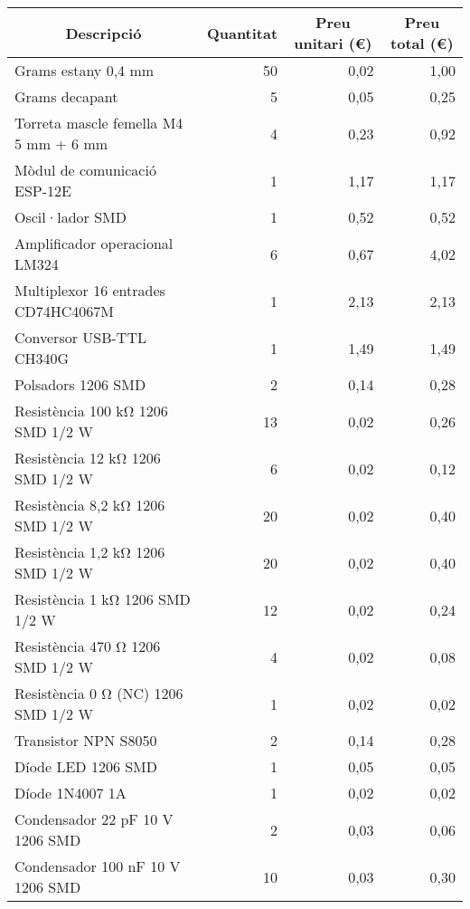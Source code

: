 \begin{table}[H]
  \begin{center}
    \begin{tabularx} {\textwidth} {|X|r|r|r|} \hline
  \multicolumn{1}{|c|}{Descripció} &  \multicolumn{1}{c|}{Quantitat} & \multicolumn{1}{c|}{Preu unitari (€)} &  \multicolumn{1}{c|}{Preu total (€)}\\ \hline \hline
    Grams estany 0,4 mm & 50    & 0,02  & 1,00 \\ \hline
    Grams decapant & 5     & 0,05  & 0,25 \\ \hline
    Torreta mascle femella M4 5 mm + 6 mm & 4     & 0,23  & 0,92 \\ \hline
    Mòdul de comunicació ESP-12E & 1     & 1,17  & 1,17 \\ \hline
    Oscil·lador SMD & 1     & 0,52  & 0,52 \\ \hline
    Amplificador operacional LM324 & 6     & 0,67  & 4,02 \\ \hline
    Multiplexor 16 entrades CD74HC4067M & 1     & 2,13  & 2,13 \\ \hline
    Conversor USB-TTL CH340G & 1     & 1,49  & 1,49 \\ \hline
    Polsadors 1206 SMD & 2     & 0,14  & 0,28 \\ \hline
    Resistència 100 k\si{\ohm} 1206 SMD 1/2 W & 13    & 0,02  & 0,26 \\ \hline
    Resistència 12 k\si{\ohm} 1206 SMD 1/2 W & 6     & 0,02  & 0,12 \\ \hline
    Resistència 8,2 k\si{\ohm} 1206 SMD 1/2 W & 20    & 0,02  & 0,40 \\ \hline
    Resistència 1,2 k\si{\ohm} 1206 SMD 1/2 W & 20    & 0,02  & 0,40 \\ \hline
    Resistència 1 k\si{\ohm} 1206 SMD 1/2 W & 12    & 0,02  & 0,24 \\ \hline
    Resistència 470 \si{\ohm} 1206 SMD 1/2 W & 4     & 0,02  & 0,08 \\ \hline
    Resistència 0 \si{\ohm} (NC) 1206 SMD 1/2 W & 1     & 0,02  & 0,02 \\ \hline
    Transistor NPN S8050 & 2     & 0,14  & 0,28 \\ \hline
    Díode LED 1206 SMD & 1     & 0,05  & 0,05 \\ \hline
    Díode 1N4007 1A & 1     & 0,02  & 0,02 \\ \hline
    Condensador 22 pF 10 V 1206 SMD & 2     & 0,03  & 0,06 \\ \hline
    Condensador 100 nF 10 V 1206 SMD & 10    & 0,03  & 0,30 \\ \hline

\end{tabularx}
\end{center}
\end{table}
